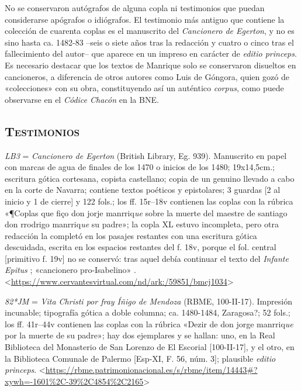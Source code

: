 \documentclass[11pt,a4paper,twoside]{article}
\newcommand{\comillas}[1]{«#1»}
\newcommand{\eg}{{\emph{LB3}}}
\newcommand{\jm}{\emph{82*JM}}
\begin{document}
%
No se conservaron autógrafos de alguna copla ni testimonios que puedan considerarse apógrafos o idiógrafos. El testimonio más antiguo que contiene la colección de cuarenta coplas es el manuscrito del \emph{Cancionero de Egerton}, y no es sino hasta ca. 1482-83 --seis o siete años tras la redacción y cuatro o cinco tras el fallecimiento del autor-- que aparece en un impreso en carácter de \emph{editio princeps}. Es necesario destacar que los textos de Manrique solo se conservaron disueltos en cancioneros, a diferencia de otros autores como Luis de Góngora, quien gozó de \comillas{colecciones} con su obra, constituyendo así un auténtico \emph{corpus}, como puede observarse en el \emph{Códice Chacón} en la BNE.\par

\subsection*{\centering\normalsize \textsc{Testimonios}}

{\eg} = \emph{Cancionero de Egerton} (British Library, Eg. 939).
%
Manuscrito en papel con marcas de agua de finales de los 1470 o inicios de los 1480; 19x14,5cm.; escritura gótica cortesana, copista castellano; copia de un genuino llevado a cabo en la corte de Navarra; contiene textos poéticos y epistolares; 3 guardas [2 al inicio y 1 de cierre] y 122 fols.; los ff. 15r--18v contienen las coplas con la rúbrica \comillas{¶Coplas que fiço don jorje manrriq\emph{ue} sobre la muerte del maestre de santiago don rrodrigo manrriq\emph{ue} su padre}; la copla XL estuvo incompleta, pero otra redacción la completó en los pasajes restantes con una escritura gótica descuidada, escrita en los espacios restantes del f. 18v, porque el fol. central [primitivo f. 19v] no se conservó: tras aquel debía continuar el texto del \emph{Infante Epitus} \textcite{Beltrán2011}; \comillas{cancionero pro-Isabelino} \parencite{Severin2000}. <\url{https://www.cervantesvirtual.com/nd/ark:/59851/bmcj1034}>\par

{\jm} = \emph{Vita Christi por fray Íñigo de Mendoza} (RBME, 100-II-17).
%
Impresión incunable; tipografía gótica a doble columna; ca. 1480-1484, Zaragosa?; 52 fols.; los ff. 41r--44v contienen las coplas con la rúbrica \comillas{Dezir de don jorge manrriq\emph{ue} por la muerte de su padre}; hay dos ejemplares y se hallan: uno, en la Real Biblioteca del Monasterio de San Lorenzo de El Escorial [100-II-17], y el otro, en la Biblioteca Comunale de Palermo [Esp-XI, F. 56, núm. 3]; plausible \emph{editio princeps}. <\url{https://rbme.patrimonionacional.es/s/rbme/item/14443#?xywh=-1601%2C-39%2C4854%2C2165}>\par
\end{document}
